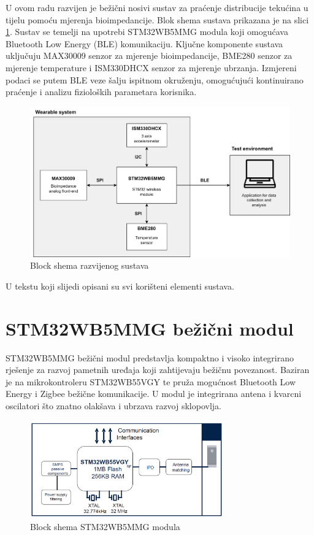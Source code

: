 \documentclass[../diplomski_rad.tex]{subfiles}
\begin{document}
\sloppy

\justifying
U ovom radu razvijen je bežični nosivi sustav za praćenje distribucije tekućina u tijelu pomoću mjerenja bioimpedancije.
Blok shema sustava prikazana je na slici \ref{slk:blok_shema}.
Sustav se temelji na upotrebi STM32WB5MMG modula koji omogućava Bluetooth Low Energy (BLE) komunikaciju. 
Ključne komponente sustava uključuju MAX30009 senzor za mjerenje bioimpedancije, 
BME280 senzor za mjerenje temperature i ISM330DHCX senzor za mjerenje ubrzanja. 
Izmjereni podaci se putem BLE veze šalju ispitnom okruženju, omogućujući kontinuirano praćenje i analizu 
fizioloških parametara korisnika. 

\begin{figure}[htb]
    \centering
    \includegraphics[width=1\textwidth]{Figures/shema_sustava.png} 
    \caption{Block shema razvijenog sustava}
    \label{slk:blok_shema}
\end{figure}

U tekstu koji slijedi opisani su svi korišteni elementi sustava.

\section{STM32WB5MMG bežični modul}

STM32WB5MMG bežični modul predstavlja kompaktno i visoko integrirano rješenje za razvoj pametnih uređaja koji zahtijevaju bežičnu povezanost. 
Baziran je na mikrokontroleru STM32WB55VGY te pruža mogućnost Bluetooth Low Energy i Zigbee bežične komunikacije. 
U modul je integrirana antena i kvarcni oscilatori što znatno olakšava i ubrzava razvoj sklopovlja.  

\begin{figure}[htb]
    \centering
    \includegraphics[width=0.75\textwidth]{Figures/stm32module.png} 
    \caption{Block shema STM32WB5MMG modula \cite{stm32module}}
    \label{slk:stm32module}
\end{figure}
\end{document}
